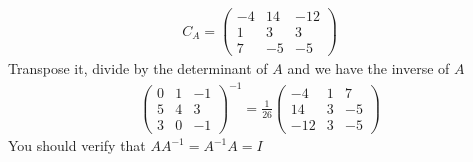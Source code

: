 {\begin{align*}
C_A = 
\begin{pmatrix}
 -4 & 14 & -12 \\
  1 &  3 &   3 \\
  7 & -5 &  -5
\end{pmatrix}
\end{align*}
Transpose it, divide by the determinant of $A$ and we have the inverse of $A$
\begin{align*}
\begin{pmatrix}
  0 & 1 & -1 \\
  5 & 4 &  3 \\
  3 & 0 & -1
\end{pmatrix}^{-1}
=
\frac{1}{26}
\begin{pmatrix}
  -4 &  1 &  7 \\
  14 &  3 & -5 \\
 -12 &  3 & -5
\end{pmatrix}
\end{align*}
You should verify that $AA^{-1}=A^{-1}A=I$
}



